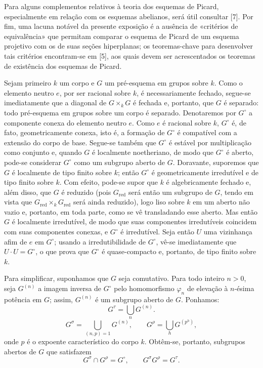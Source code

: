 Para alguns complementos relativos à teoria dos esquemas de Picard,
especialmente em relação com os esquemas abelianos, será útil consultar [7].
Por fim, uma lacuna notável da presente exposição é a ausência de «critérios
de equivalência» que permitam comparar o esquema de Picard de um esquema
projetivo com os de suas seções hiperplanas; os teoremas-chave para desenvolver
tais critérios encontram-se em [5], aos quais devem ser acrescentados os
teoremas de existência dos esquemas de Picard.


Sejam primeiro $k$ um corpo e $G$ um pré-esquema em grupos sobre $k$. Como o
elemento neutro $e$, por ser racional sobre $k$, é necessariamente fechado,
segue-se imediatamente que a diagonal de $G\times_kG$ é fechada e, portanto,
que $G$ é separado: todo pré-esquema em grupos sobre um corpo é separado.
Denotaremos por $G^\circ$ a componente conexa do elemento neutro $e$. Como $e$
é racional sobre $k$, $G^\circ$ é, de fato, geometricamente conexa, isto é, a
formação de $G^\circ$ é compatível com a extensão do corpo de base. Segue-se
também que $G^\circ$ é estável por multiplicação como conjunto e, quando $G$ é
localmente noetheriano, de modo que $G^\circ$ é aberto, pode-se considerar
$G^\circ$ como um subgrupo aberto de $G$. Doravante, suporemos que $G$ é
localmente de tipo finito sobre $k$; então $G^\circ$ é geometricamente
irredutível e de tipo finito sobre $k$. Com efeito, pode-se supor que $k$ é
algebricamente fechado e, além disso, que $G$ é reduzido (pois
$G_{\mathrm{red}}$ será então um subgrupo de $G$, tendo em vista que
$G_{\mathrm{red}}\times_kG_{\mathrm{red}}$ será ainda reduzido), logo liso
sobre $k$ em um aberto não vazio e, portanto, em toda parte, como se vê
transladando esse aberto. Mas então $G$ é localmente irredutível, de modo que
suas componentes irredutíveis coincidem com suas componentes conexas, e
$G^\circ$ é irredutível. Seja então $U$ uma vizinhança afim de $e$ em
$G^\circ$; usando a irredutibilidade de $G^\circ$, vê-se imediatamente que
$U\cdot U=G^\circ$, o que prova que $G^\circ$ é quase-compacto e, portanto, de
tipo finito sobre $k$.

Para simplificar, suponhamos que $G$ seja comutativo. Para todo inteiro $n>0$,
seja $G^{(n)}$ a imagem inversa de $G^\circ$ pelo homomorfismo $\varphi_n$ de
elevação à $n$-ésima potência em $G$; assim, $G^{(n)}$ é um subgrupo aberto de
$G$.
Ponhamos:
\[
G^\tau=\bigcup_nG^{(n)}.
\]
\[
G^\sigma=\bigcup_{(n,p)=1}G^{(n)},
\qquad
G^\rho=\bigcup_hG^{(p^h)},
\]
onde $p$ é o expoente característico do corpo $k$. Obtêm-se, portanto,
subgrupos abertos de $G$ que satisfazem
\[
G^\sigma\cap G^\rho=G^\circ,
\qquad
G^\sigma G^\rho=G^\tau.
\]


